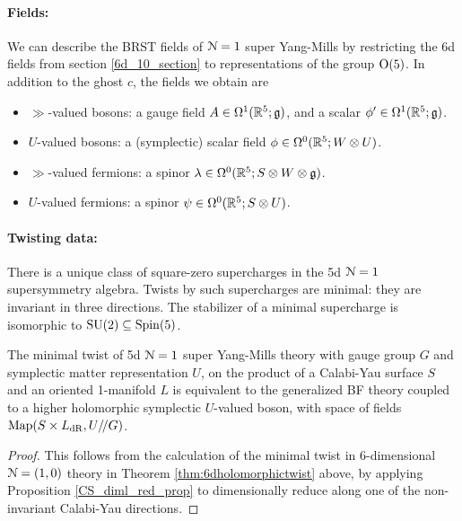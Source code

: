\documentclass[10pt, oneside]{article}
\begin{document}
\vspace{-10pt}
\paragraph{Fields:} We can describe the BRST fields of $\mathcal{N}=1$ super Yang-Mills by restricting the 6d fields from section \ref{6d_10_section} to representations of the group $\mathrm{O}(5)$.  In addition to the ghost $c$, the fields we obtain are
\begin{itemize}
 \item $\gg$-valued bosons: a gauge field $A \in \Omega^1(\mathbb R^5; \mathfrak{g})$, and a scalar $\phi' \in \Omega^1(\mathbb R^5; \mathfrak{g})$.
 \item $U$-valued bosons: a (symplectic) scalar field $\phi \in \Omega^0(\mathbb R^5; W \otimes U)$.
 \item $\gg$-valued fermions: a spinor $\lambda \in \Omega^0(\mathbb R^5; S \otimes W \otimes \mathfrak{g})$.
 \item $U$-valued fermions: a spinor $\psi \in \Omega^0(\mathbb R^5; S \otimes U)$.
\end{itemize}

\vspace{-10pt}
\paragraph{Twisting data:}
There is a unique class of square-zero supercharges in the 5d $\mathcal{N}=1$ supersymmetry algebra.  Twists by such supercharges are minimal: they are invariant in three directions.  The stabilizer of a minimal supercharge is isomorphic to $\mathrm{SU}(2) \subseteq \mathrm{Spin}(5)$.

\begin{theorem} \label{5d_holo_twist_theorem}
The minimal twist of 5d $\mathcal{N}=1$ super Yang-Mills theory with gauge group $G$ and symplectic matter representation $U$, on the product of a Calabi-Yau surface $S$ and an oriented 1-manifold $L$ is equivalent to the generalized BF theory coupled to a higher holomorphic symplectic $U$-valued boson, with space of fields $\mathrm{Map}(S \times L_{\mathrm{dR}}, U/\!/G)$.
\end{theorem}

\begin{proof}
This follows from the calculation of the minimal twist in 6-dimensional $\mathcal{N}=(1,0)$ theory in Theorem \ref{thm:6dholomorphictwist} above, by applying Proposition \ref{CS_diml_red_prop} to dimensionally reduce along one of the non-invariant Calabi-Yau directions.
\end{proof}
\end{document}
